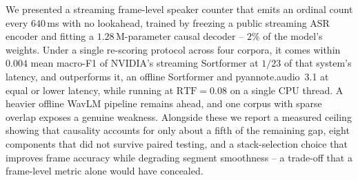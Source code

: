 \documentclass[journal]{IEEEtran}
\begin{document}
We presented a streaming frame-level speaker counter that emits an ordinal
count every $640$\,ms with no lookahead, trained by freezing a public
streaming ASR encoder and fitting a $1.28$\,M-parameter causal decoder --
$2\%$ of the model's weights. Under a single re-scoring protocol across four
corpora, it comes within $0.004$ mean macro-F1 of NVIDIA's streaming
Sortformer at $1/23$ of that system's latency, and outperforms it, an
offline Sortformer and pyannote.audio~3.1 at equal or lower latency, while
running at $\mathrm{RTF}=0.08$ on a single CPU thread. A heavier offline
WavLM pipeline remains ahead, and one corpus with sparse overlap exposes a
genuine weakness. Alongside these we report a measured ceiling showing that
causality accounts for only about a fifth of the remaining gap, eight
components that did not survive paired testing, and a stack-selection choice
that improves frame accuracy while degrading segment smoothness -- a
trade-off that a frame-level metric alone would have concealed.



\end{document}
